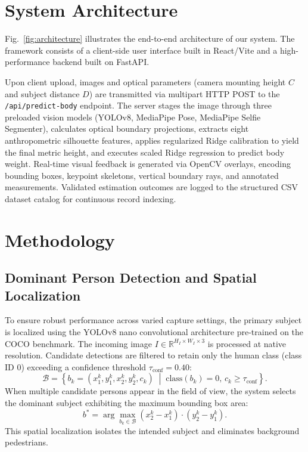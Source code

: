 \documentclass[conference]{IEEEtran}
\begin{document}
\section{System Architecture}
Fig.~\ref{fig:architecture} illustrates the end-to-end architecture of our system. The framework consists of a client-side user interface built in React/Vite and a high-performance backend built on FastAPI.

Upon client upload, images and optical parameters (camera mounting height $C$ and subject distance $D$) are transmitted via multipart HTTP POST to the \texttt{/api/predict-body} endpoint. The server stages the image through three preloaded vision models (YOLOv8, MediaPipe Pose, MediaPipe Selfie Segmenter), calculates optical boundary projections, extracts eight anthropometric silhouette features, applies regularized Ridge calibration to yield the final metric height, and executes scaled Ridge regression to predict body weight. Real-time visual feedback is generated via OpenCV overlays, encoding bounding boxes, keypoint skeletons, vertical boundary rays, and annotated measurements. Validated estimation outcomes are logged to the structured CSV dataset catalog for continuous record indexing.

\section{Methodology}
\subsection{Dominant Person Detection and Spatial Localization}
To ensure robust performance across varied capture settings, the primary subject is localized using the YOLOv8 nano convolutional architecture pre-trained on the COCO benchmark. The incoming image $I \in \mathbb{R}^{H_I \times W_I \times 3}$ is processed at native resolution. Candidate detections are filtered to retain only the human class (class ID 0) exceeding a confidence threshold $\tau_{\text{conf}} = 0.40$:
\begin{equation}
\mathcal{B} = \left\{ b_k = (x_1^k, y_1^k, x_2^k, y_2^k, c_k) \;\middle|\; \text{class}(b_k)=0, \, c_k \ge \tau_{\text{conf}} \right\}.
\end{equation}
When multiple candidate persons appear in the field of view, the system selects the dominant subject exhibiting the maximum bounding box area:
\begin{equation}
b^* = \arg\max_{b_k \in \mathcal{B}} \left( x_2^k - x_1^k \right) \cdot \left( y_2^k - y_1^k \right).
\end{equation}
This spatial localization isolates the intended subject and eliminates background pedestrians.
\end{document}
